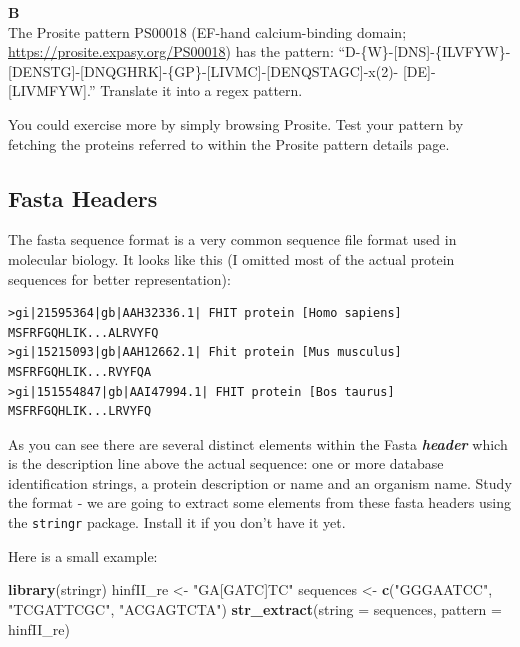 \documentclass[]{book}
\newenvironment{Shaded}{\begin{snugshade}}{\end{snugshade}}
\newcommand{\DataTypeTok}[1]{\textcolor[rgb]{0.13,0.29,0.53}{#1}}
\newcommand{\KeywordTok}[1]{\textcolor[rgb]{0.13,0.29,0.53}{\textbf{#1}}}
\newcommand{\NormalTok}[1]{#1}
\newcommand{\StringTok}[1]{\textcolor[rgb]{0.31,0.60,0.02}{#1}}
\begin{document}
\textbf{B}\\
The Prosite pattern PS00018 (EF-hand calcium-binding domain; \url{https://prosite.expasy.org/PS00018}) has the pattern:
``D-\{W\}-{[}DNS{]}-\{ILVFYW\}-{[}DENSTG{]}-{[}DNQGHRK{]}-\{GP\}-{[}LIVMC{]}-{[}DENQSTAGC{]}-x(2)- {[}DE{]}-{[}LIVMFYW{]}.''
Translate it into a regex pattern.

You could exercise more by simply browsing Prosite. Test your pattern by fetching the proteins referred to within the Prosite pattern details page.

\hypertarget{fasta-headers}{%
\subsection{Fasta Headers}\label{fasta-headers}}

The fasta sequence format is a very common sequence file format used in molecular biology.
It looks like this (I omitted most of the actual protein sequences for better representation):

\begin{verbatim}
>gi|21595364|gb|AAH32336.1| FHIT protein [Homo sapiens]
MSFRFGQHLIK...ALRVYFQ
>gi|15215093|gb|AAH12662.1| Fhit protein [Mus musculus]
MSFRFGQHLIK...RVYFQA
>gi|151554847|gb|AAI47994.1| FHIT protein [Bos taurus]
MSFRFGQHLIK...LRVYFQ
\end{verbatim}

As you can see there are several distinct elements within the Fasta \textbf{\emph{header}} which is the description line above the actual sequence: one or more database identification strings, a protein description or name and an organism name. Study the format - we are going to extract some elements from these fasta headers using the \texttt{stringr} package. Install it if you don't have it yet.

Here is a small example:

\begin{Shaded}
\begin{Highlighting}[]
\KeywordTok{library}\NormalTok{(stringr)}
\NormalTok{hinfII_re <-}\StringTok{ "GA[GATC]TC"}
\NormalTok{sequences <-}\StringTok{ }\KeywordTok{c}\NormalTok{(}\StringTok{"GGGAATCC"}\NormalTok{, }\StringTok{"TCGATTCGC"}\NormalTok{, }\StringTok{"ACGAGTCTA"}\NormalTok{)}
\KeywordTok{str_extract}\NormalTok{(}\DataTypeTok{string =}\NormalTok{ sequences,}
            \DataTypeTok{pattern =}\NormalTok{ hinfII_re)}
\end{Highlighting}
\end{Shaded}
\end{document}
